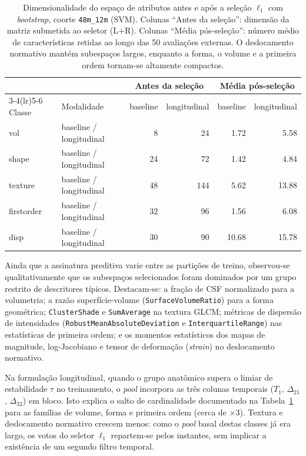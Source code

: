 \documentclass[review]{elsarticle}
\newcommand{\code}[1]{\texttt{#1}}
\begin{document}
	\begin{table}[htbp]
		\centering
		\footnotesize
		\caption{Dimensionalidade do espaço de atributos antes e após a seleção $\ell_1$ com \emph{bootstrap}, coorte \code{48m\_12m} (SVM). Colunas ``Antes da seleção'': dimensão da matriz submetida ao seletor (L$+$R). Colunas ``Média pós-seleção'': número médio de características retidas ao longo das 50 avaliações externas. O deslocamento normativo mantém subespaços largos, enquanto a forma, o volume e a primeira ordem tornam-se altamente compactos.}
		\label{tab:nfeat}
		\begin{tabular}{ll rr rr}
			\toprule
			& & \multicolumn{2}{c}{Antes da seleção} & \multicolumn{2}{c}{Média pós-seleção} \\
			\cmidrule(lr){3-4}\cmidrule(lr){5-6}
			Classe & Modalidade & baseline & longitudinal & baseline & longitudinal \\
			\midrule
			vol & baseline / longitudinal & 8 & 24 & 1.72 & 5.58 \\
			shape & baseline / longitudinal & 24 & 72 & 1.42 & 4.84 \\
			texture & baseline / longitudinal & 48 & 144 & 5.62 & 13.88 \\
			firstorder & baseline / longitudinal & 32 & 96 & 1.56 & 6.08 \\
			disp & baseline / longitudinal & 30 & 90 & 10.68 & 15.78 \\
			\bottomrule
		\end{tabular}
	\end{table}
	
	Ainda que a assinatura preditiva varie entre as partições de treino, observou-se qualitativamente que os subespaços selecionados foram dominados por um grupo restrito de descritores típicos. Destacam-se: a fração de CSF normalizado para a volumetria; a razão superfície-volume (\code{SurfaceVolumeRatio}) para a forma geométrica; \code{ClusterShade} e \code{SumAverage} na textura GLCM; métricas de dispersão de intensidades (\code{RobustMeanAbsoluteDeviation} e \code{InterquartileRange}) nas estatísticas de primeira ordem; e os momentos estatísticos dos mapas de magnitude, log-Jacobiano e tensor de deformação (\emph{strain}) no deslocamento normativo. 
	
	Na formulação longitudinal, quando o grupo anatômico supera o limiar de estabilidade $\tau$ no treinamento, o \emph{pool} incorpora as três colunas temporais ($T_1$, $\Delta_{21}$, $\Delta_{32}$) em bloco. Isto explica o salto de cardinalidade documentado na Tabela~\ref{tab:nfeat} para as famílias de volume, forma e primeira ordem (cerca de $\times 3$). Textura e deslocamento normativo crescem menos: como o \emph{pool} basal destas classes já era largo, os votos do seletor $\ell_1$ repartem-se pelos instantes, sem implicar a existência de um segundo filtro temporal.
	
\end{document}
